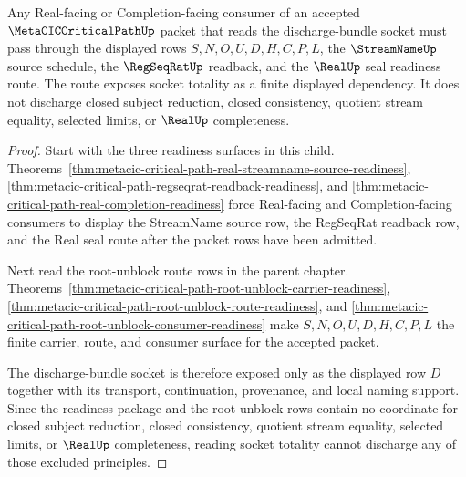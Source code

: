 \begin{theorem}
\label{thm:metacic-critical-path-discharge-socket-totality-route}
Any Real-facing or Completion-facing consumer of an accepted $\MetaCICCriticalPathUp$ packet that reads the discharge-bundle socket must pass through the displayed rows $S,N,O,U,D,H,C,P,L$, the $\StreamNameUp$ source schedule, the $\RegSeqRatUp$ readback, and the $\RealUp$ seal readiness route. The route exposes socket totality as a finite displayed dependency. It does not discharge closed subject reduction, closed consistency, quotient stream equality, selected limits, or $\RealUp$ completeness.
\end{theorem}
\begin{proof}
Start with the three readiness surfaces in this child. Theorems~\ref{thm:metacic-critical-path-real-streamname-source-readiness}, \ref{thm:metacic-critical-path-regseqrat-readback-readiness}, and \ref{thm:metacic-critical-path-real-completion-readiness} force Real-facing and Completion-facing consumers to display the StreamName source row, the RegSeqRat readback row, and the Real seal route after the packet rows have been admitted.

Next read the root-unblock route rows in the parent chapter. Theorems~\ref{thm:metacic-critical-path-root-unblock-carrier-readiness}, \ref{thm:metacic-critical-path-root-unblock-route-readiness}, and \ref{thm:metacic-critical-path-root-unblock-consumer-readiness} make $S,N,O,U,D,H,C,P,L$ the finite carrier, route, and consumer surface for the accepted packet.

The discharge-bundle socket is therefore exposed only as the displayed row $D$ together with its transport, continuation, provenance, and local naming support. Since the readiness package and the root-unblock rows contain no coordinate for closed subject reduction, closed consistency, quotient stream equality, selected limits, or $\RealUp$ completeness, reading socket totality cannot discharge any of those excluded principles.
\end{proof}
